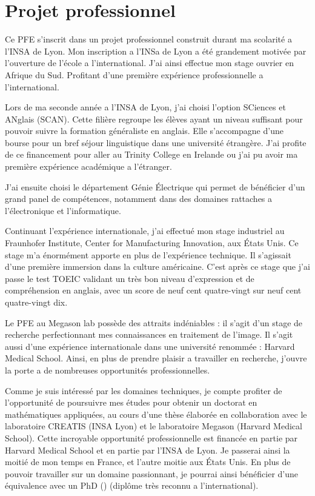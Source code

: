 \section{Projet professionnel}

Ce PFE s'inscrit dans un projet professionnel construit durant ma scolarité a l'INSA de Lyon.
Mon inscription a l'INSa de Lyon a été grandement motivée par l'ouverture de l'école a l'international. J'ai ainsi effectue mon stage ouvrier en Afrique du Sud. Profitant d'une première expérience professionnelle a l'international.

Lors de ma seconde année a l'INSA de Lyon, j'ai choisi l'option SCiences et ANglais (SCAN). Cette filière regroupe les élèves ayant un niveau suffisant pour pouvoir suivre la formation généraliste en anglais. Elle s'accompagne d'une bourse pour un bref séjour linguistique dans une université étrangère. J'ai profite de ce financement pour aller au Trinity College en Irelande ou j'ai pu avoir ma première expérience académique a l'étranger.

J'ai ensuite choisi le département Génie Électrique qui permet de bénéficier d'un grand panel de compétences, notamment dans des domaines rattaches a l'électronique et l'informatique.

Continuant l'expérience internationale, j'ai effectué mon stage industriel au Fraunhofer Institute, Center for Manufacturing Innovation, aux États Unis. Ce stage m'a énormément apporte en plus de l'expérience technique. Il s'agissait d'une première immersion dans la culture américaine. C'est après ce stage que j'ai passe le test TOEIC validant un très bon niveau d'expression et de compréhension en anglais, avec un score de neuf cent quatre-vingt sur neuf cent quatre-vingt dix.

Le PFE au Megason lab possède des attraits indéniables : il s'agit d'un stage de recherche perfectionnant mes connaissances en traitement de l'image. Il s'agit aussi d'une expérience internationale dans une université renommée : Harvard Medical School. Ainsi, en plus de prendre plaisir a travailler en recherche, j'ouvre la porte a de nombreuses opportunités professionnelles.

Comme je suis intéressé par les domaines techniques, je compte profiter de l'opportunité de poursuivre mes études pour obtenir un doctorat en mathématiques appliquées, au cours d'une thèse élaborée en collaboration avec le laboratoire CREATIS (INSA Lyon) et le laboratoire Megason (Harvard Medical School). Cette incroyable opportunité professionnelle est financée en partie par Harvard Medical School et en partie par l'INSA de Lyon. Je passerai ainsi la moitié de mon temps en France, et l'autre moitie aux États Unis.
En plus de pouvoir travailler sur un domaine passionnant, je pourrai ainsi bénéficier d'une équivalence avec un PhD () (diplôme très reconnu a l'international). 

